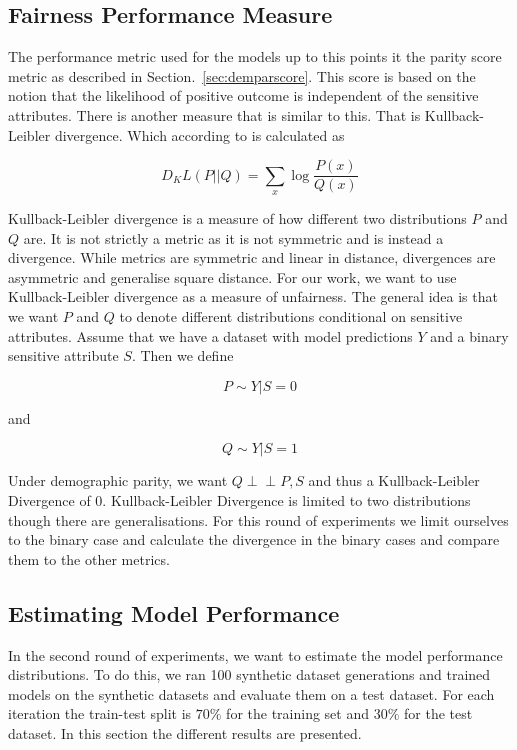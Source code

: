 \subsection{Fairness Performance Measure}

The performance metric used for the models up to this points it the parity score metric as described in Section.~\ref{sec:demparscore}. This score is based on the notion that the likelihood of positive outcome is independent of the sensitive attributes. There is another measure that is similar to this. That is Kullback-Leibler divergence. Which according to \citet{Mackay:2003:information} is calculated as 

\begin{equation*}
    D_KL(P ||Q) = \sum_x \log\frac{P(x)}{Q(x)}
\end{equation*}

Kullback-Leibler divergence is a measure of how different two distributions $P$ and $Q$ are. It is not strictly a metric as it is not symmetric and is instead a divergence. While metrics are symmetric and linear in distance, divergences are asymmetric and generalise square distance. For our work, we want to use Kullback-Leibler divergence as a measure of unfairness. The general idea is that we want $P$ and $Q$ to denote different distributions conditional on sensitive attributes. Assume that we have a dataset with model predictions $Y$ and a binary sensitive attribute $S$. Then we define 

\begin{equation*}
    P \sim Y | S = 0
\end{equation*}

and

\begin{equation*}
    Q \sim Y | S = 1
\end{equation*}

Under demographic parity, we want $Q \perp\!\!\!\perp P , S$ and thus a Kullback-Leibler Divergence of 0. Kullback-Leibler Divergence is limited to two distributions though there are generalisations. For this round of experiments we limit ourselves to the binary case and calculate the divergence in the binary cases and compare them to the other metrics.

\subsection{Estimating Model Performance}

In the second round of experiments, we want to estimate the model performance distributions. To do this, we ran 100 synthetic dataset generations and trained models on the synthetic datasets and evaluate them on a test dataset. For each iteration the train-test split is $70\%$ for the training set and $30\%$ for the test dataset. In this section the different results are presented.

